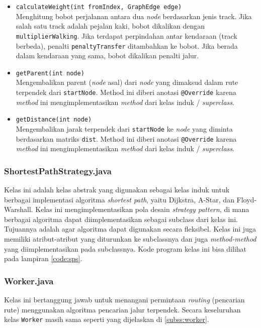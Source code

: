 \begin{itemize}
\begin{itemize}
        \item \texttt{calculateWeight(int fromIndex, GraphEdge edge)}
        \\ Menghitung bobot perjalanan antara dua \textit{node} berdasarkan jenis track. Jika salah satu track adalah pejalan kaki, bobot dikalikan dengan \texttt{multiplierWalking}. Jika terdapat perpindahan antar kendaraan (track berbeda), penalti \texttt{penaltyTransfer} ditambahkan ke bobot. Jika berada dalam kendaraan yang sama, bobot dikalikan penalti jalur.

        \item \texttt{getParent(int node)}
        \\ Mengembalikan parent (\textit{node} asal) dari \textit{node} yang dimaksud dalam rute terpendek dari \texttt{startNode}. Method ini diberi anotasi \texttt{@Override} karena \textit{method} ini mengimplementasikan \textit{method} dari kelas induk / \textit{superclass}.

        \item \texttt{getDistance(int node)}
        \\ Mengembalikan jarak terpendek dari \texttt{startNode} ke \textit{node} yang diminta berdasarkan matriks \texttt{dist}. Method ini diberi anotasi \texttt{@Override} karena \textit{method} ini mengimplementasikan \textit{method} dari kelas induk / \textit{superclass}.
    \end{itemize}
\end{itemize}
\newpage
\subsubsection{ShortestPathStrategy.java}
Kelas ini adalah kelas abstrak yang digunakan sebagai kelas induk untuk berbagai implementasi algoritma \textit{shortest path}, yaitu Dijkstra, A-Star, dan Floyd-Warshall. Kelas ini mengimplementasikan pola desain \textit{strategy pattern}, di mana berbagai algoritma dapat diimplementasikan sebagai subclass dari kelas ini. Tujuannya adalah agar algoritma dapat digunakan secara fleksibel. Kelas ini juga memiliki atribut-atribut yang diturunkan ke subclassnya dan juga \textit{method-method} yang diimplementasikan pada subclassnya. Kode program kelas ini bisa dilihat pada lampiran \ref{code:sps}.

\subsubsection{Worker.java}
Kelas ini bertanggung jawab untuk menangani permintaan \textit{routing} (pencarian rute) menggunakan algoritma pencarian jalur terpendek. Secara keseluruhan kelas \texttt{Worker} masih sama seperti yang dijelaskan di \ref{subss:worker}.

